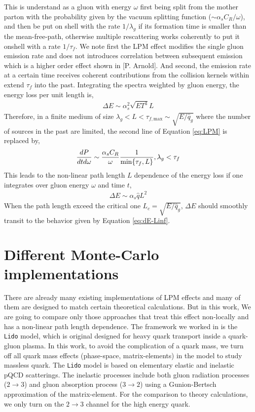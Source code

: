 \documentclass[aps, prc, reprint, amsmath, groupedaddress, nofootinbib]{revtex4-1}
\begin{document}
This is understand as a gluon with energy $\omega$ first being split from the mother parton with the probability given by the vacuum splitting function ($\sim \alpha_s C_R/\omega$), and then be put on shell with the rate $1/\lambda_g$ if its formation time is smaller than the mean-free-path, otherwise multiple rescattering works coherently to put it onshell with a rate $1/\tau_f$. 
We note first the LPM effect modifies the single gluon emission rate and does not introduces correlation between subsequent emission which is a higher order effect shown in [P. Arnold].
And second, the emission rate at a certain time receives coherent contributions from the collision kernels within extend $\tau_f$ into the past.
Integrating the spectra weighted by gluon energy, the energy loss per unit length is,
\begin{eqnarray}\label{eq:dE-Linf}
\Delta E \sim \alpha_s^2 \sqrt{ET^3} L
\end{eqnarray}
Therefore, in a finite medium of size $\lambda_g < L< \tau_{f,\textrm{max}} \sim \sqrt{E/\hat{q}_g}$ where the number of sources in the past are limited, the second line of Equation \ref{eq:LPM} is replaced by,
\begin{eqnarray}
\frac{dP}{dt d\omega} \sim 
 \frac{\alpha_s C_R}{\omega} \frac{1}{\min\{\tau_f,L\}}, \hfill \lambda_g < \tau_f
\end{eqnarray}
This leads to the non-linear path length $L$ dependence of the energy loss if one integrates over gluon energy $\omega$ and time $t$,
\begin{eqnarray}\label{eq:dE-Lfinite}
\Delta E \sim \alpha_s \hat{q} L^2
\end{eqnarray}
When the path length exceed the critical one $L_c = \sqrt{E/\hat{q}_g}$, $\Delta E$ should smoothly transit to the behavior given by Equation \ref{eq:dE-Linf}.

\section{Different Monte-Carlo implementations}\label{section:MC}
There are already many existing implementations of LPM effects and many of them are designed to match certain theoretical calculations. 
But in this work, We are going to compare only those approaches that treat this effect non-locally and has a non-linear path length dependence.
The framework we worked in is the {\tt Lido} model, which is original designed for heavy quark transport inside a quark-gluon plasma. 
In this work, to avoid the complication of a quark mass, we turn off all quark mass effects (phase-space, matrix-elements) in the model to study massless quark.
The {\tt Lido} model is based on elementary elastic and inelastic pQCD scatterings. 
The inelastic processes include both gluon radiation processes ($2\rightarrow 3$) and gluon absorption process ($3\rightarrow 2$) using a Gunion-Bertsch approximation of the matrix-element.
For the comparison to theory calculations, we only turn on the $2\rightarrow 3$ channel for the high energy quark.
\end{document}

